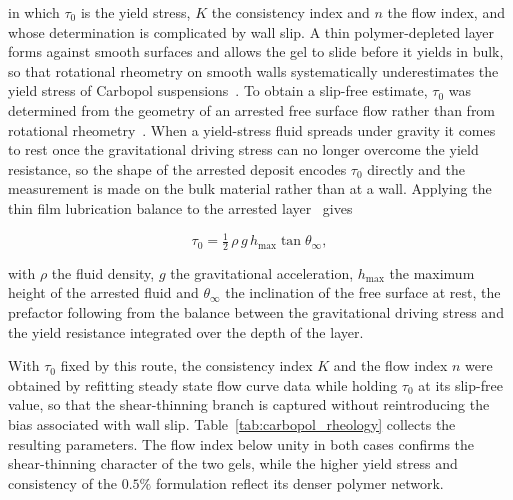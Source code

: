 \documentclass[%
  aip,
  pof,          %
  reprint,      %
  floatfix
]{revtex4-2}
\begin{document}
in which $\tau_0$ is the yield stress, $K$ the consistency index and $n$ the flow index, and whose determination is complicated by wall slip. A thin polymer-depleted layer forms against smooth surfaces and allows the gel to slide before it yields in bulk, so that rotational rheometry on smooth walls systematically underestimates the yield stress of Carbopol suspensions~\cite{younes2020slippery,meeker2004slip}. To obtain a slip-free estimate, $\tau_0$ was determined from the geometry of an arrested free surface flow rather than from rotational rheometry~\cite{coussot1996deposits,roussel2005fifty}. When a yield-stress fluid spreads under gravity it comes to rest once the gravitational driving stress can no longer overcome the yield resistance, so the shape of the arrested deposit encodes $\tau_0$ directly and the measurement is made on the bulk material rather than at a wall. Applying the thin film lubrication balance to the arrested layer~\cite{balmforth2007viscoplastic} gives

\begin{equation}
    \tau_0 = \tfrac{1}{2}\,\rho\,g\,h_{\max}\tan\theta_\infty,
    \label{eq:arrested_deposit}
\end{equation}

with $\rho$ the fluid density, $g$ the gravitational acceleration, $h_{\max}$ the maximum height of the arrested fluid and $\theta_\infty$ the inclination of the free surface at rest, the prefactor following from the balance between the gravitational driving stress and the yield resistance integrated over the depth of the layer.

With $\tau_0$ fixed by this route, the consistency index $K$ and the flow index $n$ were obtained by refitting steady state flow curve data while holding $\tau_0$ at its slip-free value, so that the shear-thinning branch is captured without reintroducing the bias associated with wall slip. Table~\ref{tab:carbopol_rheology} collects the resulting parameters. The flow index below unity in both cases confirms the shear-thinning character of the two gels, while the higher yield stress and consistency of the $0.5\%$ formulation reflect its denser polymer network.
\end{document}
